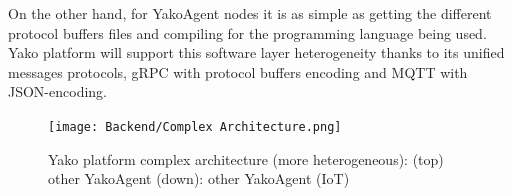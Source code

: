         On the other hand, for YakoAgent nodes it is as simple as getting the different protocol buffers files and compiling for the programming language being used. Yako platform will support this software layer heterogeneity thanks to its unified messages protocols, gRPC with protocol buffers encoding and MQTT with JSON-encoding.
        
        \begin{figure}[H]
            \centering
            \texttt{[image: Backend/Complex Architecture.png]}
            \caption{Yako platform complex architecture (more heterogeneous): (top) other YakoAgent   (down): other YakoAgent (IoT) }
            \label{fig:complex_architecture}
        \end{figure}
